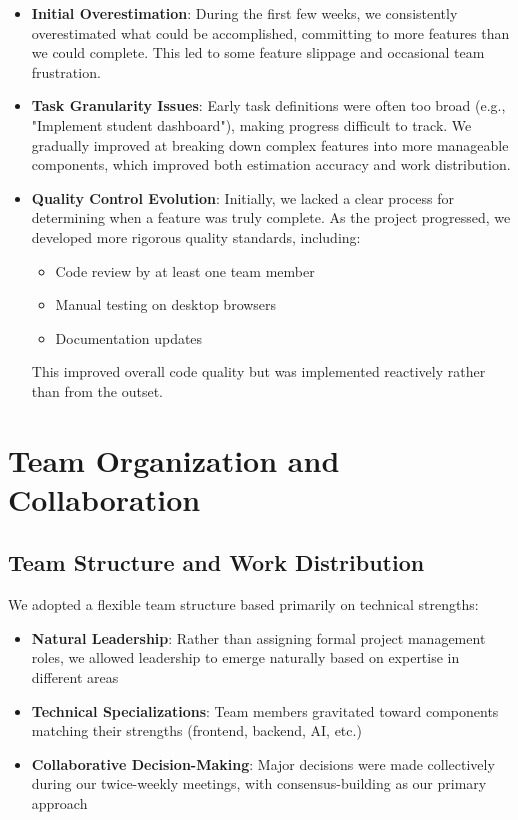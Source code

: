 \begin{itemize}
    \item \textbf{Initial Overestimation}: During the first few weeks, we consistently overestimated what could be accomplished, committing to more features than we could complete. This led to some feature slippage and occasional team frustration.
    
    \item \textbf{Task Granularity Issues}: Early task definitions were often too broad (e.g., "Implement student dashboard"), making progress difficult to track. We gradually improved at breaking down complex features into more manageable components, which improved both estimation accuracy and work distribution.
    
    \item \textbf{Quality Control Evolution}: Initially, we lacked a clear process for determining when a feature was truly complete. As the project progressed, we developed more rigorous quality standards, including:
    \begin{itemize}
        \item Code review by at least one team member
        \item Manual testing on desktop browsers
        \item Documentation updates
    \end{itemize}
    This improved overall code quality but was implemented reactively rather than from the outset.
\end{itemize}

\section{Team Organization and Collaboration}

\subsection{Team Structure and Work Distribution}

We adopted a flexible team structure based primarily on technical strengths:

\begin{itemize}
    \item \textbf{Natural Leadership}: Rather than assigning formal project management roles, we allowed leadership to emerge naturally based on expertise in different areas
    
    \item \textbf{Technical Specializations}: Team members gravitated toward components matching their strengths (frontend, backend, AI, etc.)
    
    \item \textbf{Collaborative Decision-Making}: Major decisions were made collectively during our twice-weekly meetings, with consensus-building as our primary approach
\end{itemize}


